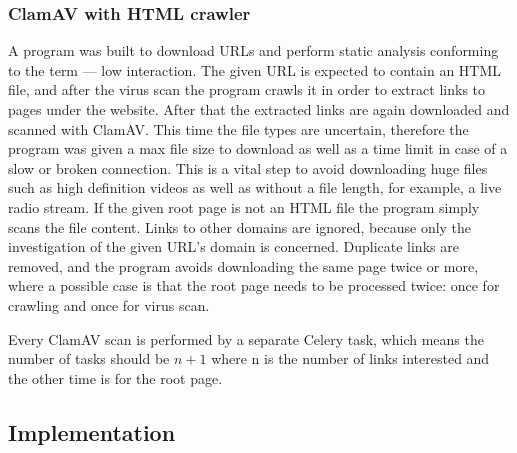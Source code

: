 \subsubsection{ClamAV with HTML crawler}
A program was built to download URLs and perform static analysis conforming to the term --- low interaction. The given URL is expected to contain 
an HTML file, and after the virus scan the program crawls it in order to extract links to pages 
under the website. After that the extracted links are again downloaded and 
scanned with ClamAV. This time the file types are uncertain, therefore the program was given a max file size to download as well as a time limit in case of a 
slow or broken connection. This is a vital step to avoid downloading huge files such as 
high definition videos as well as without a file length, for example, a live radio stream.
If the given root page is not an HTML file the program simply scans the file content. 
Links to other domains are ignored, because only the investigation 
of the given URL's domain is concerned. Duplicate links are removed, and the 
program avoids downloading the same page twice or more, where a possible case 
is that the root page needs 
to be processed twice: once for crawling and once for virus scan.

Every ClamAV scan is performed by a separate Celery task, which means the 
number of tasks should be $n+1$ where n is the number of links interested and 
the other time is for the root page.  

\subsection{Implementation}
